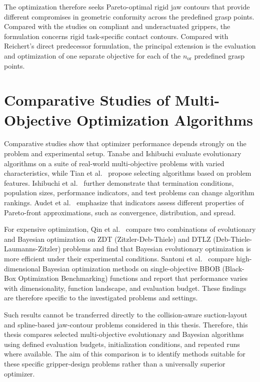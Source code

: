 The optimization therefore seeks Pareto-optimal rigid jaw contours that provide different compromises in geometric conformity across the predefined
grasp points. Compared with the studies on compliant and underactuated grippers, the formulation concerns rigid task-specific contact contours.
Compared with Reichert's direct predecessor formulation, the principal extension is the evaluation and optimization of one separate objective for
each of the $n_{\mathrm{or}}$ predefined grasp points.

\section{Comparative Studies of Multi-Objective Optimization Algorithms}
\label{subsec:comparative_optimization_studies}

Comparative studies show that optimizer performance depends strongly on the problem and experimental setup. Tanabe and Ishibuchi \cite{Tanabe2020An}
evaluate evolutionary algorithms on a suite of real-world multi-objective problems with varied characteristics, while Tian et al.\
\cite{Tian2019Automated} propose selecting algorithms based on problem features. Ishibuchi et al.\ \cite{Ishibuchi2022Difficulties} further
demonstrate that termination conditions, population sizes, performance indicators, and test problems can change algorithm rankings. Audet et al.\
\cite{Audet2018Performance} emphasize that indicators assess different properties of Pareto-front approximations, such as convergence, distribution,
and spread.

For expensive optimization, Qin et al.\ \cite{Qin2019Bayesian} compare two combinations of evolutionary and Bayesian optimization on ZDT
(Zitzler-Deb-Thiele) and DTLZ (Deb-Thiele-Laumanns-Zitzler) problems and find that Bayesian evolutionary optimization is more efficient under their experimental conditions. Santoni
et al.\ \cite{Santoni2023Comparison} compare high-dimensional Bayesian optimization methods on single-objective BBOB (Black-Box Optimization Benchmarking) functions and report that
performance varies with dimensionality, function landscape, and evaluation budget. These findings are therefore specific to the investigated problems
and settings.

Such results cannot be transferred directly to the collision-aware suction-layout and spline-based jaw-contour problems considered in this thesis.
Therefore, this thesis compares selected multi-objective evolutionary and Bayesian algorithms using defined evaluation budgets, initialization
conditions, and repeated runs where available. The aim of this comparison is to identify methods suitable for these specific gripper-design
problems rather than a universally superior optimizer.

